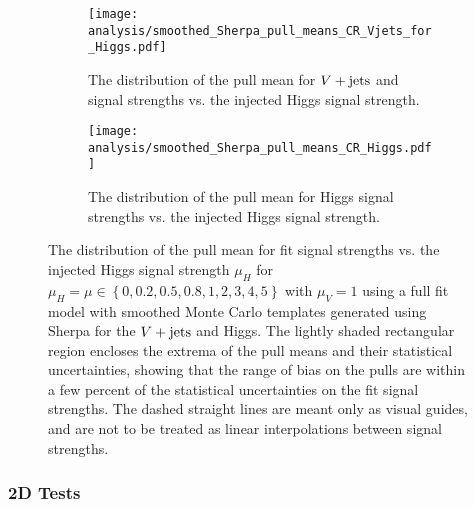 \begin{figure}[htbp]
 \centering
 \begin{subfigure}[t]{0.48\textwidth}
  \centering
  \texttt{[image: analysis/smoothed\_Sherpa\_pull\_means\_CR\_Vjets\_for\_Higgs.pdf]}
  \caption[The distribution of the pull mean for $\Vjets$ and signal strengths vs. the injected Higgs signal strength.]{%
   The distribution of the pull mean for $\Vjets$ and signal strengths vs. the injected Higgs signal strength.}
  \label{fig:pulls_Vjets_smoothed_Sherpa}
 \end{subfigure}%
 \quad
 \begin{subfigure}[t]{0.48\textwidth}
  \centering
  \texttt{[image: analysis/smoothed\_Sherpa\_pull\_means\_CR\_Higgs.pdf]}
  \caption[The distribution of the pull mean for Higgs signal strengths vs. the injected Higgs signal strength.]{%
   The distribution of the pull mean for Higgs signal strengths vs. the injected Higgs signal strength.}
  \label{fig:pulls_Higgs_smoothed_Sherpa}
 \end{subfigure}
 \caption[The distribution of the pull mean for fit signal strengths vs. the injected Higgs signal strength.]{%
  The distribution of the pull mean for fit signal strengths vs. the injected Higgs signal strength $\mu_{H}$ for $\mu_{H} = \mu \in \left\{0, 0.2, 0.5, 0.8, 1, 2, 3, 4, 5\right\}$ with $\mu_{V} = 1$ using a full fit model with smoothed Monte Carlo templates generated using Sherpa for the $\Vjets$ and Higgs.
  The lightly shaded rectangular region encloses the extrema of the pull means and their statistical uncertainties, showing that the range of bias on the pulls are within a few percent of the statistical uncertainties on the fit signal strengths.
  The dashed straight lines are meant only as visual guides, and are not to be treated as linear interpolations between signal strengths.}
 \label{fig:pulls_summary_Higgs_smoothed_Sherpa}
\end{figure}

\subsubsection{2D Tests}

